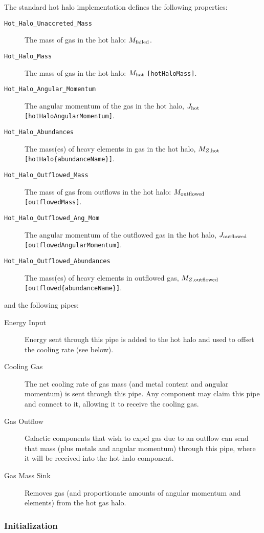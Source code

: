 The standard hot halo implementation defines the following properties:
\begin{description}
 \item [{\tt Hot\_Halo\_Unaccreted\_Mass}] The mass of gas in the hot halo: $M_{\rm failed}$.
 \item [{\tt Hot\_Halo\_Mass}] The mass of gas in the hot halo: $M_{\rm hot}$ {\tt [hotHaloMass]}.
 \item [{\tt Hot\_Halo\_Angular\_Momentum}] The angular momentum of the gas in the hot halo, $J_{\rm hot}$ {\tt [hotHaloAngularMomentum]}.
 \item [{\tt Hot\_Halo\_Abundances}] The mass(es) of heavy elements in gas in the hot halo, $M_{Z, {\rm hot}}$ {\tt [hotHalo\{abundanceName\}]}.
 \item [{\tt Hot\_Halo\_Outflowed\_Mass}] The mass of gas from outflows in the hot halo: $M_{\rm outflowed}$ {\tt [outflowedMass]}.
 \item [{\tt Hot\_Halo\_Outflowed\_Ang\_Mom}] The angular momentum of the outflowed gas in the hot halo, $J_{\rm outflowed}$ {\tt [outflowedAngularMomentum]}.
 \item [{\tt Hot\_Halo\_Outflowed\_Abundances}] The mass(es) of heavy elements in outflowed gas, $M_{Z, {\rm outflowed}}$ {\tt [outflowed\{abundanceName\}]}.
\end{description}
and the following pipes:
\begin{description}
 \item [Energy Input] Energy sent through this pipe is added to the hot halo and used to offset the cooling rate (see below).
 \item [Cooling Gas] The net cooling rate of gas mass (and metal content and angular momentum) is sent through this pipe. Any component may claim this pipe and connect to it, allowing it to receive the cooling gas.
 \item [Gas Outflow] Galactic components that wish to expel gas due to an outflow can send that mass (plus metals and angular momentum) through this pipe, where it will be received into the hot halo component. 
 \item [Gas Mass Sink] Removes gas (and proportionate amounts of angular momentum and elements) from the hot gas halo.
\end{description}

\subsubsection{Initialization}

